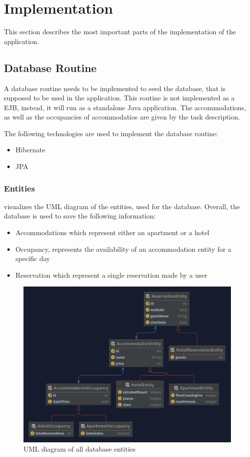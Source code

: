 \section{Implementation}\label{sec:02_impl}
This section describes the most important parts of the implementation of the application.


\subsection{Database Routine}
A database routine needs to be implemented to seed the database, that is supposed to be used in the application.
This routine is not implemented as a EJB, instead, it will run as a standalone Java application.
The accommodations, as well as the occupancies of accommodatios are given by the task description.

The following technologies are used to implement the database routine:
\begin{itemize}
\item Hibernate
\item JPA
\end{itemize}

\subsubsection{Entities}
 visualizes the UML diagram of the entities, used for the database.
Overall, the database is used to save the following information:
\begin{itemize}
\item Accommodations which represent either an apartment or a hotel
\item Occupancy, represents the availability of an accommodation entity for a specific day
\item Reservation which represent a single reservation made by a user
\end{itemize}

\begin{figure}[h]
\centering
\includegraphics[scale=0.3]{images/02_impl/entities}
\caption{UML diagram of all database entities}
\label{fig:02_impl_db_entities}
\end{figure}

